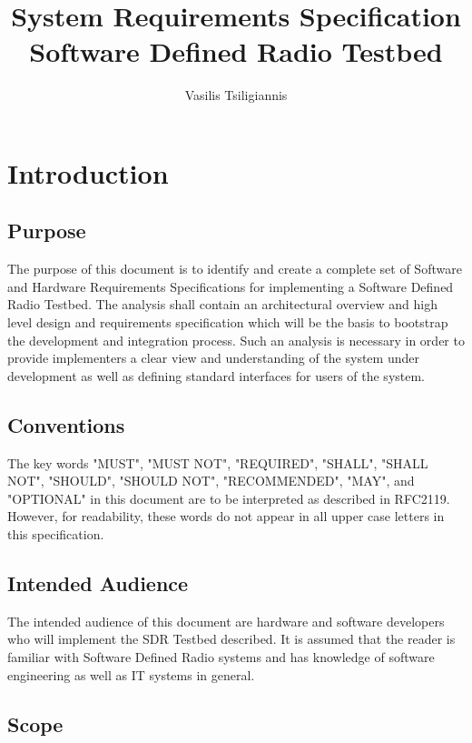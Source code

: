 \documentclass[english,titlepage,a4paper]{report}
\title{
  System Requirements Specification \\
  \large Software Defined Radio Testbed
}
\author{Vasilis Tsiligiannis}
\begin{document}
\maketitle
\tableofcontents


\chapter{Introduction}
\section{Purpose}

The purpose of this document is to identify and create a complete set of Software and Hardware Requirements Specifications for implementing a Software Defined Radio Testbed.
The analysis shall contain an architectural overview and high level design and requirements specification which will be the basis to bootstrap the development and integration process.
Such an analysis is necessary in order to provide implementers a clear view and understanding of the system under development as well as defining standard interfaces for users of the system.

\section{Conventions}

The key words "MUST", "MUST NOT", "REQUIRED", "SHALL", "SHALL NOT", "SHOULD", "SHOULD NOT", "RECOMMENDED", "MAY", and "OPTIONAL" in this document are to be interpreted as described in RFC2119. However, for readability, these words do not appear in all upper case letters in this specification.

\printglossary[type=definitions,numberedsection,style=definitions,nonumberlist]

\section{Intended Audience}

The intended audience of this document are hardware and software developers who will implement the SDR Testbed described.
It is assumed that the reader is familiar with Software Defined Radio systems and has knowledge of software engineering as well as IT systems in general.

\section{Scope}
\end{document}
